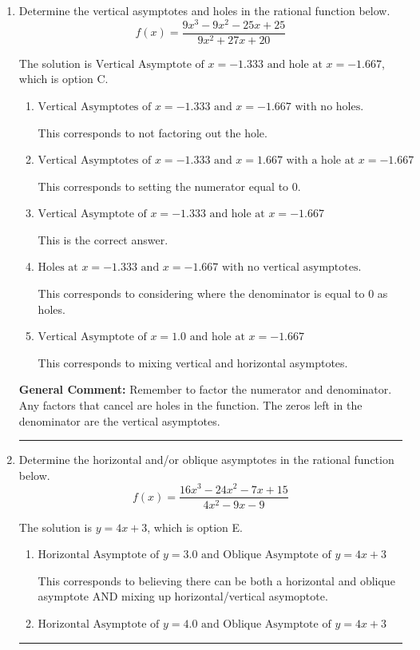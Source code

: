 \documentclass{extbook}[14pt]
\newcommand{\litem}[1]{\item #1

\rule{\textwidth}{0.4pt}}
\begin{document}
\begin{enumerate}\litem{
Determine the vertical asymptotes and holes in the rational function below.
\[ f(x) = \frac{9x^{3} -9 x^{2} -25 x + 25}{9x^{2} +27 x + 20} \]

The solution is \( \text{Vertical Asymptote of } x = -1.333 \text{ and hole at } x = -1.667 \), which is option C.\begin{enumerate}[label=\Alph*.]
\item \( \text{Vertical Asymptotes of } x = -1.333 \text{ and } x = -1.667 \text{ with no holes.} \)

This corresponds to not factoring out the hole.
\item \( \text{Vertical Asymptotes of } x = -1.333 \text{ and } x = 1.667 \text{ with a hole at } x = -1.667 \)

This corresponds to setting the numerator equal to 0.
\item \( \text{Vertical Asymptote of } x = -1.333 \text{ and hole at } x = -1.667 \)

This is the correct answer.
\item \( \text{Holes at } x = -1.333 \text{ and } x = -1.667 \text{ with no vertical asymptotes.} \)

This corresponds to considering where the denominator is equal to 0 as holes.
\item \( \text{Vertical Asymptote of } x = 1.0 \text{ and hole at } x = -1.667 \)

This corresponds to mixing vertical and horizontal asymptotes.
\end{enumerate}

\textbf{General Comment:} Remember to factor the numerator and denominator. Any factors that cancel are holes in the function. The zeros left in the denominator are the vertical asymptotes.
}
\litem{
Determine the horizontal and/or oblique asymptotes in the rational function below.
\[ f(x) = \frac{16x^{3} -24 x^{2} -7 x + 15}{4x^{2} -9 x -9} \]

The solution is \( y = 4x + 3 \), which is option E.\begin{enumerate}[label=\Alph*.]
\item \( \text{Horizontal Asymptote of } y = 3.0 \text{ and Oblique Asymptote of } y = 4x + 3 \)

This corresponds to believing there can be both a horizontal and oblique asymptote AND mixing up horizontal/vertical asymoptote.
\item \( \text{Horizontal Asymptote of } y = 4.0 \text{ and Oblique Asymptote of } y = 4x + 3 \)


\end{enumerate}}
\end{enumerate}
\end{document}
